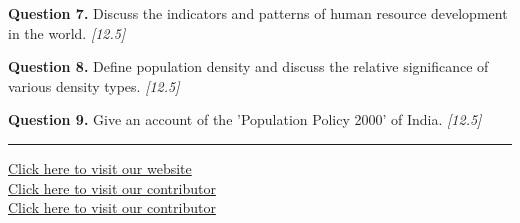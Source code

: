 \documentclass[11pt,a4paper]{article}
\newcommand{\pts}[1]{\hfill   \textit{[#1]}}
\begin{document}
\medskip


\noindent   \textbf{Question 7.} Discuss the indicators and patterns of human resource development in the world. \pts{12.5}

\medskip


\noindent   \textbf{Question 8.} Define population density and discuss the relative significance of various density types. \pts{12.5}

\medskip


\noindent   \textbf{Question 9.} Give an account of the 'Population Policy 2000' of India. \pts{12.5}

\vfill\rule{\linewidth}{0.4pt}

\begin{center}\small
\href{https://bhu-exam.vercel.app/}{Click here to visit our website}\\[4pt]
\href{https://me-aryan.vercel.app/}{Click here to visit our contributor}\\[4pt]
\href{https://quashan-me.vercel.app/}{Click here to visit our contributor}
\end{center}
\end{document}

